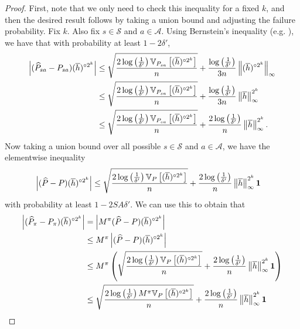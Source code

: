 \documentclass{article}
\theoremstyle{plain}
\theoremstyle{plain}
\theoremstyle{remark}
\theoremstyle{plain}
\theoremstyle{plain}
\newcommand{\Var}{\mathbb{V}}
\newcommand{\Phat}{\widehat{P}}
\newcommand{\one}{\mathbf{1}}
\newcommand{\hc}{\overline{h}}
\newcommand{\A}{\mathcal{A}}
\renewcommand{\S}{\mathcal{S}}
\begin{document}
\begin{proof}
    First, note that we only need to check this inequality for a fixed $k$, and then the desired result follows by taking a union bound and adjusting the failure probability. Fix $k$. Also fix $s \in \S$ and $a \in \A$. Using Bernstein's inequality (e.g. \cite[Theorem 3]{maurer_empirical_2009}), we have that with probability at least $1 - 2 \delta'$,
    \begin{align*}
        \left|(\Phat_{sa} - P_{sa}) (\hc)^{\circ 2^k} \right| &\leq \sqrt{\frac{2 \log \left( \frac{1}{\delta'}\right) \Var_{P_{sa}}\left[(\hc)^{\circ 2^k} \right] }{n}} + \frac{\log \left( \frac{1}{\delta'}\right)   }{ 3n} \infnorm{(\hc)^{\circ 2^k}} \\
        &\leq \sqrt{\frac{2 \log \left( \frac{1}{\delta'}\right) \Var_{P_{sa}}\left[(\hc)^{\circ 2^k} \right] }{n}} + \frac{\log \left( \frac{1}{\delta'}\right)   }{ 3n} \infnorm{\hc}^{2^k} \\
        &\leq \sqrt{\frac{2 \log \left( \frac{1}{\delta'}\right) \Var_{P_{sa}}\left[(\hc)^{\circ 2^k} \right] }{n}} + \frac{2 \log \left( \frac{1}{\delta'}\right)   }{ n} \infnorm{\hc}^{2^k}.
    \end{align*}
    Now taking a union bound over all possible $s \in \S$ and $a \in \A$, we have the elementwise inequality
    \begin{align}
        \left|(\Phat - P) (\hc)^{\circ 2^k} \right| 
        &\leq \sqrt{\frac{2 \log \left( \frac{1}{\delta'}\right) \Var_{P}\left[(\hc)^{\circ 2^k} \right] }{n}} + \frac{2 \log \left( \frac{1}{\delta'}\right)   }{ n} \infnorm{\hc}^{2^k} \one \label{eq:AMDP_eval_bernstein_elementwise}
    \end{align}
    with probability at least $1 - 2SA\delta'$. We can use this to obtain that
    \begin{align*}
        \left|(\Phat_\pi - P_\pi) (\hc)^{\circ 2^k} \right| &= \left|M^\pi(\Phat - P) (\hc)^{\circ 2^k} \right| \\
        & \leq M^\pi \left|(\Phat - P) (\hc)^{\circ 2^k} \right| \\
        & \leq  M^\pi \left( \sqrt{\frac{2 \log \left( \frac{1}{\delta'}\right) \Var_{P}\left[(\hc)^{\circ 2^k} \right] }{n}} + \frac{2 \log \left( \frac{1}{\delta'}\right)   }{ n} \infnorm{\hc}^{2^k} \one \right) \\
        & \leq   \sqrt{\frac{2 \log \left( \frac{1}{\delta'}\right) M^\pi \Var_{P}\left[(\hc)^{\circ 2^k} \right] }{n}} + \frac{2 \log \left( \frac{1}{\delta'}\right)   }{ n} \infnorm{\hc}^{2^k} \one \\

\end{align*}
\end{proof}
\end{document}

